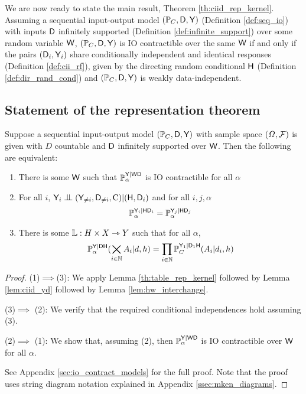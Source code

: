 We are now ready to state the main result, Theorem \ref{th:ciid_rep_kernel}. Assuming a sequential input-output model $(\mathbb{P}_C,\mathsf{D},\mathsf{Y})$ (Definition \ref{def:seq_io}) with inputs $\mathsf{D}$ infinitely supported (Definition \ref{def:infinite_support}) over some random variable $\mathsf{W}$, $(\mathbb{P}_C,\mathsf{D},\mathsf{Y})$ is IO contractible over the same $\mathsf{W}$ if and only if the pairs $(\mathsf{D}_i, \mathsf{Y}_i)$ share conditionally independent and identical responses (Definition \ref{def:cii_rf}), given by the directing random conditional $\mathsf{H}$ (Definition \ref{def:dir_rand_cond}) and $(\mathbb{P}_C,\mathsf{D},\mathsf{Y})$ is weakly data-independent.

\subsection{Statement of the representation theorem}\label{sec:reptheorem_statement}

\begin{theorem}\label{th:ciid_rep_kernel}
Suppose a sequential input-output model $(\mathbb{P}_C,\mathsf{D},\mathsf{Y})$ with sample space $(\Omega,\mathcal{F})$ is given with $D$ countable and $\mathsf{D}$ infinitely supported over $\mathsf{W}$. Then the following are equivalent:
\begin{enumerate}
    \item There is some $\mathsf{W}$ such that $\mathbb{P}_\alpha^{\mathsf{Y}|\mathsf{WD}}$ is IO contractible for all $\alpha$
    \item For all $i$, $\RV{Y}_i\CI (\RV{Y}_{\neq i},\RV{D}_{\neq i},\text{C})|(\RV{H},\RV{D}_i)$ and for all $i,j, \alpha$ $$\mathbb{P}_\alpha^{\mathsf{Y}_i|\mathsf{H}\mathsf{D}_i}=\mathbb{P}_\alpha^{\mathsf{Y}_j|\mathsf{H}\mathsf{D}_j}$$
    \item There is some $\mathbb{L}:H\times X\rightarrowtriangle Y$ such that for all $\alpha$, $$\mathbb{P}_\alpha^{\mathsf{Y}|\mathsf{DH}}(\bigtimes_{i\in\mathbb{N}} A_{i}|d,h)= \prod_{i\in\mathbb{N}} \mathbb{P}_C^{\mathsf{Y}_1|\mathsf{D}_1\mathsf{H}}(A_i|d_i,h)$$
\end{enumerate}
\end{theorem}

\begin{proof}
(1)$\implies$(3):
We apply Lemma \ref{th:table_rep_kernel} followed by Lemma \ref{lem:ciid_yd} followed by Lemma \ref{lem:hw_interchange}.


(3)$\implies$ (2):
We verify that the required conditional independences hold assuming (3).

(2)$\implies$ (1):
We show that, assuming (2), then $\mathbb{P}_\alpha^{\mathsf{Y}|\mathsf{WD}}$ is IO contractible over $\mathsf{W}$ for all $\alpha$.

See Appendix \ref{sec:io_contract_models} for the full proof. Note that the proof uses string diagram notation explained in Appendix \ref{ssec:mken_diagrams}.
\end{proof}

